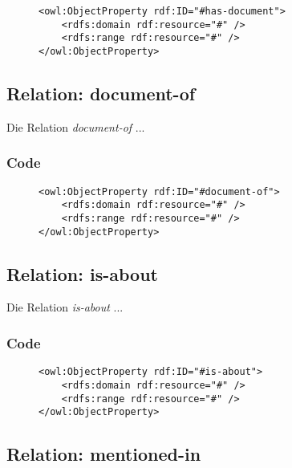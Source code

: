 \documentclass[
    11pt,
    latin1,
    a4paper,
    oneside
]{scrreprt}
\begin{document}
\begin{figure}[h]
 \lstset{language=XML}
 \begin{lstlisting}[label=owl:word]
<owl:ObjectProperty rdf:ID="#has-document">
	<rdfs:domain rdf:resource="#" />
	<rdfs:range rdf:resource="#" />
</owl:ObjectProperty>
 \end{lstlisting}
\end{figure}


\subsection{Relation: document-of} \label{sec:rel_documentof}

Die Relation \emph{document-of} ...

\subsubsection{Code} \label{sec:rel_documentof_code}

\begin{figure}[h]
 \lstset{language=XML}
 \begin{lstlisting}[label=owl:word]
<owl:ObjectProperty rdf:ID="#document-of">
	<rdfs:domain rdf:resource="#" />
	<rdfs:range rdf:resource="#" />
</owl:ObjectProperty>
 \end{lstlisting}
\end{figure}


\subsection{Relation: is-about} \label{sec:rel_isabout}

Die Relation \emph{is-about} ...

\subsubsection{Code} \label{sec:rel_isabout_code}

\begin{figure}[h]
 \lstset{language=XML}
 \begin{lstlisting}[label=owl:word]
<owl:ObjectProperty rdf:ID="#is-about">
	<rdfs:domain rdf:resource="#" />
	<rdfs:range rdf:resource="#" />
</owl:ObjectProperty>
 \end{lstlisting}
\end{figure}


\subsection{Relation: mentioned-in} \label{sec:rel_mentionedin}
\end{document}
